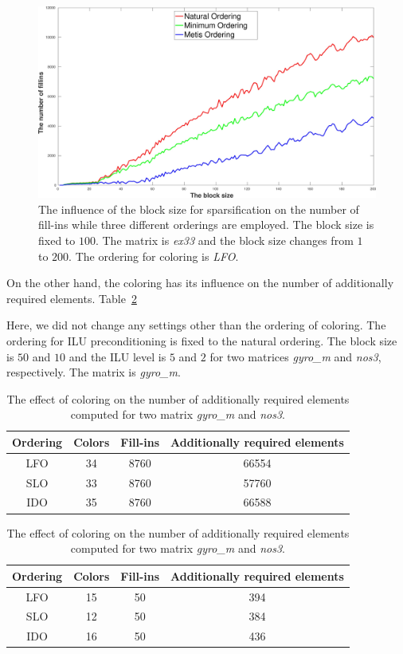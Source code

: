 \documentclass[12pt, oneside]{book}
\begin{document}
\begin{figure}
\centering
\includegraphics[width=0.9\linewidth]{bls_fillins_orderings.jpg}
\caption{The influence of the block size for sparsification on the number of fill-ins
while three different orderings are employed. 
The block size is fixed to $100$. 
The matrix is \textit{ex33} and the block size changes from $1$ to $200$.
The ordering for coloring is \textit{LFO}.}
\label{bls_fillins_orderings}
\end{figure}

On the other hand, the coloring has its influence on the number of 
additionally required elements. Table~\ref{col-effect}

Here, we did not change any settings other than the ordering of coloring. The ordering for
ILU preconditioning is fixed to the natural ordering.
The block size is $50$ and $10$ and the ILU level is $5$ and $2$ for two matrices
\textit{gyro\_m} and \textit{nos3}, respectively.
The matrix is \textit{gyro\_m}.
\begin{table}
\begin{tabular}{|c|c|c|c|}
\hline
Ordering & Colors & Fill-ins & Additionally required elements \\\hline
LFO &  34 & 8760 & 66554 \\\hline
SLO &  33 & 8760 & 57760 \\\hline
IDO &  35 & 8760 & 66588 \\\hline
\end{tabular}
\begin{tabular}{|c|c|c|c|}
Ordering & Colors & Fill-ins & Additionally required elements \\\hline
LFO &  15 & 50 & 394 \\\hline
SLO &  12 & 50 & 384 \\\hline
IDO &  16 & 50 & 436 \\\hline
\end{tabular}
\caption{The effect of coloring on the number of additionally required elements
computed for two matrix \textit{gyro\_m} and \textit{nos3}. }
\label{col-effect}
\end{table}
\end{document}
